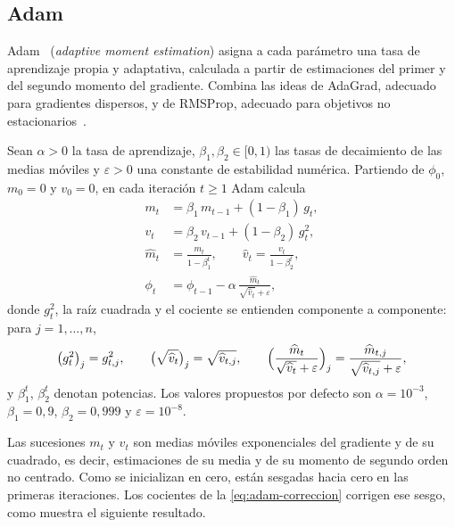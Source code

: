 \subsection{Adam}\label{sec:adam}

Adam~\cite{kingma2014} (\emph{adaptive moment estimation}) asigna a cada
parámetro una tasa de aprendizaje propia y adaptativa, calculada a partir de
estimaciones del primer y del segundo momento del gradiente. Combina las ideas
de AdaGrad, adecuado para gradientes dispersos, y de RMSProp, adecuado para
objetivos no estacionarios~\cite{kingma2014}.

\begin{definicion}\label{def:adam}
Sean $\alpha > 0$ la tasa de aprendizaje, $\beta_1, \beta_2 \in [0, 1)$ las tasas
de decaimiento de las medias móviles y $\varepsilon > 0$ una constante de
estabilidad numérica. Partiendo de $\phi_0$, $m_0 = 0$ y $v_0 = 0$, en cada
iteración $t \ge 1$ Adam calcula
\begin{align}
  m_t &= \beta_1\, m_{t-1} + (1 - \beta_1)\, g_t ,
      \label{eq:adam-m}\\
  v_t &= \beta_2\, v_{t-1} + (1 - \beta_2)\, g_t^{2} ,
      \label{eq:adam-v}\\
  \widehat{m}_t &= \frac{m_t}{1 - \beta_1^{t}}, \qquad
  \widehat{v}_t = \frac{v_t}{1 - \beta_2^{t}},
      \label{eq:adam-correccion}\\
  \phi_t &= \phi_{t-1} - \alpha\, \frac{\widehat{m}_t}{\sqrt{\widehat{v}_t} + \varepsilon},
      \label{eq:adam-actualizacion}
\end{align}
donde $g_t^2$, la raíz cuadrada y el cociente se entienden componente a
componente: para $j = 1,\dots,n$,
\[
  \bigl(g_t^2\bigr)_j = g_{t,j}^2, \qquad
  \bigl(\sqrt{\widehat{v}_t}\bigr)_j = \sqrt{\widehat{v}_{t,j}}, \qquad
  \Bigl(\frac{\widehat{m}_t}{\sqrt{\widehat{v}_t} + \varepsilon}\Bigr)_j
    = \frac{\widehat{m}_{t,j}}{\sqrt{\widehat{v}_{t,j}} + \varepsilon},
\]
y $\beta_1^t$, $\beta_2^t$ denotan potencias.
Los valores propuestos
por defecto son $\alpha = 10^{-3}$, $\beta_1 = 0{,}9$, $\beta_2 = 0{,}999$ y
$\varepsilon = 10^{-8}$.
\end{definicion}

Las sucesiones $m_t$ y $v_t$ son medias móviles exponenciales del gradiente y de
su cuadrado, es decir, estimaciones de su media y de su momento de segundo orden
no centrado. Como se inicializan en cero, están sesgadas hacia cero en las
primeras iteraciones. Los cocientes de la \cref{eq:adam-correccion} corrigen ese
sesgo, como muestra el siguiente resultado.

